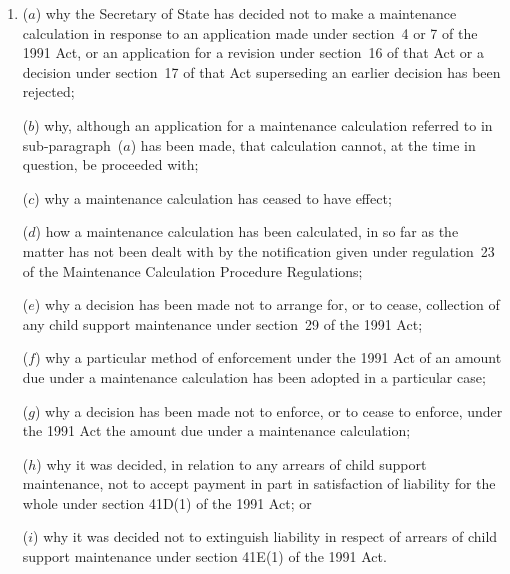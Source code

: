 \documentclass[12pt,a4paper]{article}
\begin{document}
\begin{enumerate}\item[]
($a$) why 
the Secretary of State  %
has decided not to make a maintenance calculation in response to an application made under section~4 or 7 of the 1991 Act, or an application for a revision under section~16 of that Act or a decision under section~17 of that Act superseding an earlier decision has been rejected;

($b$) why, although an application for a maintenance calculation referred to in sub-paragraph~($a$)  has been made, that calculation cannot, at the time in question, be proceeded with;

($c$) why a maintenance calculation has ceased to have effect;

($d$) how a maintenance calculation has been calculated, in so far as the matter has not been dealt with by the notification given under regulation~23 of the Maintenance Calculation Procedure Regulations;

($e$) why a decision has been made not to arrange for, or to cease, collection of any child support maintenance under section~29 of the 1991 Act;

($f$) why a particular method of enforcement under the 1991 Act of an amount due under a maintenance calculation has been adopted in a particular case; 

($g$) why a decision has been made not to enforce, or to cease to enforce, under the 1991 Act the amount due under a maintenance calculation;

($h$) why it was decided, in relation to any arrears of child support maintenance, not to accept payment in part in satisfaction of liability for the whole under section 41D(1) of the 1991 Act; or

($i$) why it was decided not to extinguish liability in respect of arrears of child support maintenance under section 41E(1) of the 1991 Act.
\end{enumerate}
\end{document}
